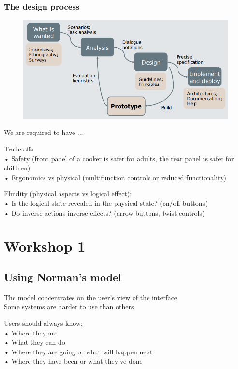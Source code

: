 \documentclass[]{project_plan}
\begin{document}
\newpage

\subsection{The design process}
\begin{figure}[h!]
  \centering
  \includegraphics[width=\linewidth]{design_process.png}
\end{figure}

We are required to have ...

Trade-offs:\\
• Safety (front panel of a cooker is safer for adults, the rear panel is safer for children)\\
• Ergonomics vs physical (multifunction controls or reduced functionality)

Fluidity (physical aspects vs logical effect):\\
• Is the logical state revealed in the physical state? (on/off buttons)\\
• Do inverse actions inverse effects? (arrow buttons, twist controls)

\chapter{Workshop 1}

\section{Using Norman’s model}
The model concentrates on the user’s view of the interface\\
Some systems are harder to use than others

Users should always know;\\
• Where they are\\
• What they can do\\
• Where they are going or what will happen next\\
• Where they have been or what they’ve done
\end{document}
